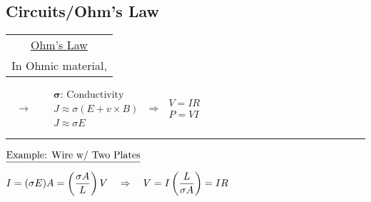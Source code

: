 \documentclass[12pt]{article}
\begin{document}
\newpage
\subsection{Circuits/Ohm's Law}
\noindent
\begin{tabular}{c}
	\underline{Ohm's Law}\\[5pt]
	In Ohmic material, 
\end{tabular}
\ \ \(\rightarrow\) \ \ \
\( \begin{gathered}
	\boldsymbol{\sigma} \text{: Conductivity}\\[5pt]
	J \approx \sigma (E + v \times B)\\
	\boxed{ J \approx \sigma E }
\end{gathered} \)
\indent \(\Rightarrow\) \indent
\( \begin{gathered}
	\boxed{V = IR}\\
	\boxed{P = VI}
\end{gathered} \)
\indent \rule[-35pt]{.5pt}{70pt} \indent 
\( \begin{aligned}
	&\text{\underline{Example: Wire w/ Two Plates}} \\[5pt]
	&I = (\sigma E) A = \left( \frac{\sigma A}{L} \right) V \ \ \ \Rightarrow \ \ \
	V = I \left( \frac{L}{\sigma A} \right) = IR
\end{aligned} \)
\end{document}
